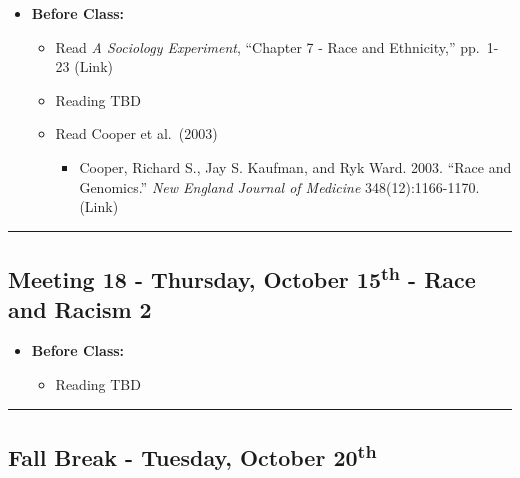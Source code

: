 \documentclass[
]{book}
\providecommand{\tightlist}{%
  \setlength{\itemsep}{0pt}\setlength{\parskip}{0pt}}
\begin{document}
\begin{itemize}
\tightlist
\item
  \textbf{Before Class:}

  \begin{itemize}
  \tightlist
  \item
    Read \emph{A Sociology Experiment}, ``Chapter 7 - Race and Ethnicity,'' pp.~1-23 (Link)
  \item
    Reading TBD
  \item
    Read Cooper et al.~(2003)

    \begin{itemize}
    \tightlist
    \item
      Cooper, Richard S., Jay S. Kaufman, and Ryk Ward. 2003. ``Race and Genomics.'' \emph{New England Journal of Medicine} 348(12):1166-1170. (Link)
    \end{itemize}
  \end{itemize}
\end{itemize}

\begin{center}\rule{0.5\linewidth}{0.5pt}\end{center}

\hypertarget{meeting-18---thursday-october-15th---race-and-racism-2}{%
\subsection*{\texorpdfstring{Meeting 18 - Thursday, October 15\textsuperscript{th} - Race and Racism 2}{Meeting 18 - Thursday, October 15th - Race and Racism 2}}\label{meeting-18---thursday-october-15th---race-and-racism-2}}

\begin{itemize}
\tightlist
\item
  \textbf{Before Class:}

  \begin{itemize}
  \tightlist
  \item
    Reading TBD
  \end{itemize}
\end{itemize}

\begin{center}\rule{0.5\linewidth}{0.5pt}\end{center}

\hypertarget{fall-break---tuesday-october-20th}{%
\subsection*{\texorpdfstring{Fall Break - Tuesday, October 20\textsuperscript{th}}{Fall Break - Tuesday, October 20th}}\label{fall-break---tuesday-october-20th}}
\end{document}
